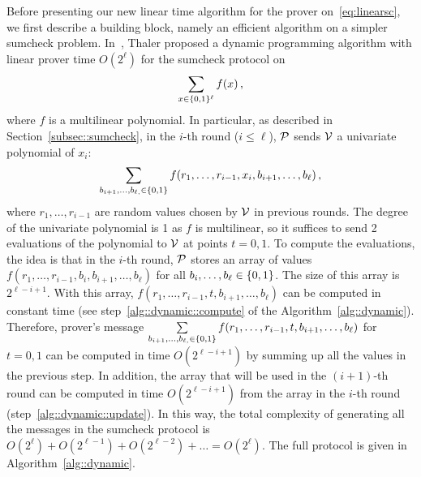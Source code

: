 Before presenting our new linear time algorithm for the prover on~\ref{eq:linearsc}, we first describe a building block, namely an efficient algorithm on a simpler sumcheck problem. In~\cite{JT_Thesis}, Thaler proposed a dynamic programming algorithm with linear prover time $O(2^\ell)$ for the sumcheck protocol on $$\sum\limits_{x\in\binary^\ell}f(x)\, ,$$ where $f$ is a multilinear polynomial. In particular, as described in Section~\ref{subsec::sumcheck}, in the $i$-th round ($i\le \ell$), $\P$ sends $\V$ a univariate polynomial of $x_i$: $$\sum\limits_{b_{i+1}, \ldots,b_{\ell, }\in\binary}f(r_1,\ldots, r_{i-1}, x_{i}, b_{i+1},\ldots, b_{\ell})\, ,$$ where $r_1, \ldots, r_{i-1}$ are random values chosen by $\V$ in previous rounds. The degree of the univariate polynomial is 1 as $f$ is multilinear, so it suffices to send 2 evaluations of the polynomial to $\V$ at points $t = 0,1$. To compute the evaluations, the idea is that in the $i$-th round, $\P$ stores an array of values $f(r_1,\ldots, r_{i-1}, b_{i}, b_{i+1},\ldots, b_{\ell})$ for all $b_i,\ldots,b_\ell\in\binary$. The size of this array is $2^{\ell-i+1}$. With this array, $f(r_1,\ldots, r_{i-1}, t, b_{i+1},\ldots, b_{\ell})$ can be computed in constant time (see step~\ref{alg::dynamic::compute} of the Algorithm~\ref{alg::dynamic}). Therefore, prover's message $\sum\limits_{b_{i+1}, \ldots,b_{\ell, }\in\binary}f(r_1,\ldots, r_{i-1}, t, b_{i+1},\ldots, b_{\ell})$ for $t=0,1$ can be computed in time $O(2^{\ell-i+1})$ by summing up all the values in the previous step. In addition, the array that will be used in the $(i+1)$-th round can be computed in time $O(2^{\ell-i+1})$ from the array in the $i$-th round (step~\ref{alg::dynamic::update}).  In this way, the total complexity of generating all the messages in the sumcheck protocol is $O(2^{\ell})+ O(2^{\ell-1}) + O(2^{\ell-2}) + \ldots = O(2^\ell)$. The full protocol is given in Algorithm~\ref{alg::dynamic}. 



